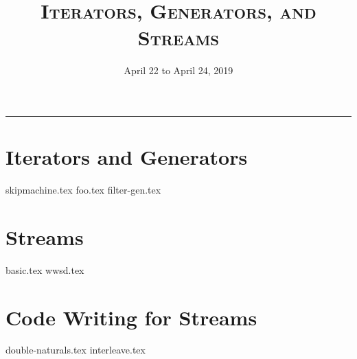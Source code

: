 \documentclass{exam}
\title{\textsc{Iterators, Generators, and Streams}}
\date{April 22 to April 24, 2019}
\begin{document}
\maketitle\rule{\textwidth}{0.15em}
\fontsize{12}{15}\selectfont

\section{Iterators and Generators}
\begin{questions}
{skipmachine.tex}
{foo.tex}
{filter-gen.tex}
\end{questions}
\section{Streams}
\begin{questions}
{basic.tex}
\newpage
{wwsd.tex}
\end{questions}
\section{Code Writing for Streams}
{double-naturals.tex}
{interleave.tex}
\end{document}
